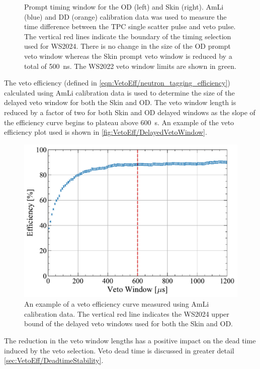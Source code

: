 \begin{figure}[!ht]
	\caption[Prompt timing window for the OD (left) and Skin (right). 
    AmLi (blue) and DD (orange) calibration data was used to measure the time difference between the TPC single scatter pulse and veto pulse.]{Prompt timing window for the OD (left) and Skin (right). 
    AmLi (blue) and DD (orange) calibration data was used to measure the time difference between the TPC single scatter pulse and veto pulse. 
    The vertical red lines indicate the boundary of the timing selection used for WS2024. There is no change in the size of the OD prompt veto window whereas the Skin prompt veto window is reduced by a total of 500~ns. The WS2022 veto window limits are shown in green.}
	\label{fig:VetoEff/veto_prompt_windows}
\end{figure}

The veto efficiency (defined in \ref{eqn:VetoEff/neutron_tagging_efficiency}) calculated using AmLi calibration data is used to determine the size of the delayed veto window for both the Skin and OD. The veto window length is reduced by a factor of two for both Skin and OD delayed windows as the slope of the efficiency curve begins to plateau above 600~\textmu s. An example of the veto efficiency plot used is shown in \autoref{fig:VetoEff/DelayedVetoWindow}.
\begin{figure}[!ht]
    \centering
    \includegraphics[width=0.7\linewidth]{figures/VetoEfficiency/DelayedVetoWindow.pdf}
    \caption[An example of a veto efficiency curve measured using AmLi calibration data.]{An example of a veto efficiency curve measured using AmLi calibration data. The vertical red line indicates the WS2024 upper bound of the delayed veto windows used for both the Skin and OD.}
    \label{fig:VetoEff/DelayedVetoWindow}
\end{figure}

The reduction in the veto window lengths has a positive impact on the dead time induced by the veto selection. Veto dead time is discussed in greater detail \autoref{sec:VetoEff/DeadtimeStability}.

